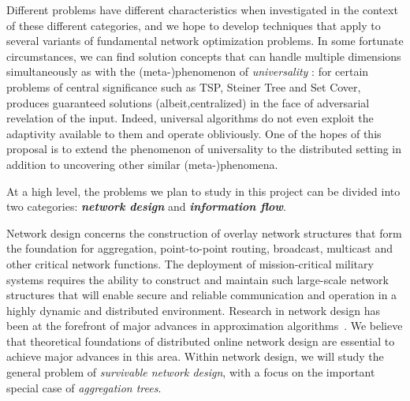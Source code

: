 Different problems have different characteristics when investigated in
the context of these different categories, and we hope to develop
techniques that apply to several variants of fundamental network
optimization problems.  In some fortunate circumstances, we can find
solution concepts that can handle multiple dimensions simultaneously
as with the (meta-)phenomenon of {\em universality}
\cite{jia+lnrs:universal}: for certain problems of central
significance such as TSP, Steiner Tree and Set Cover, produces
guaranteed solutions (albeit,centralized) in the face of adversarial
revelation of the input.  Indeed, universal algorithms do not even
exploit the adaptivity available to them and operate obliviously.  One
of the hopes of this proposal is to extend the phenomenon of
universality to the distributed setting in addition to uncovering
other similar (meta-)phenomena.

At a high level, the problems we plan to study in this project can be
divided into two categories: {\bf \em network design}\/ and {\bf \em
information flow}.
\medskip

 Network design concerns the construction of
overlay network structures that form the foundation for aggregation,
point-to-point routing, broadcast, multicast and other critical
network functions.  The deployment of mission-critical military
systems requires the ability to construct and maintain such
large-scale network structures that will enable secure and reliable
communication and operation in a highly dynamic and distributed
environment.  Research in network design has been at the forefront of
major advances in approximation algorithms~\cite{SWbook}.  We believe that
theoretical foundations of distributed online network design are
essential to achieve major advances in this area.  Within network
design, we will study the general problem of {\em survivable network
design}, with a focus on the important special case of {\em
aggregation trees}.


